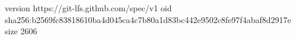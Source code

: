 version https://git-lfs.github.com/spec/v1
oid sha256:b2569fc83818610ba4d045ca4c7b80a1d83bc442e9502c8fe97f4abaf8d2917e
size 2606
